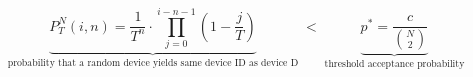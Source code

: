 \documentclass{standalone}
\begin{document}
\centering
\begin{minipage}{13cm}
	\[
		\underbrace{
			P^N_T(i, n)
			=
			\frac{1}{T^n}
			\cdot
			\prod_{j=0}^{i - n - 1}
			\left(1 - \frac{j}{T}\right)
		}_{\text{probability that a random device yields same device ID as device D}}
		\;<\;
		\underbrace{
			p^* = \frac{c}{\binom{N}{2}}
		}_{\text{threshold acceptance probability}}
	\]
\end{minipage}
\end{document}
